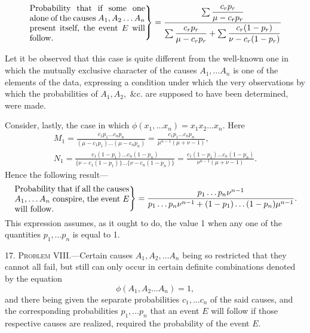 \documentclass[oneside]{book}
\begin{document}
\begin{equation*}
\left.\begin{minipage}{.4\linewidth}Probability that if some one
alone of the causes $A_1, A_2\dotsc A_n$
present itself, the event $E$
will follow.\end{minipage}\right\}
=\frac{\sum \displaystyle \frac{c_r p_r}{\mu - c_r p_r}}{\sum {\displaystyle \frac{c_r p_r}{\mu - c_r p_r}}+\sum \displaystyle \frac{c_r(1-p_r)}{\nu - c_r(1-p_r)}}
\end{equation*}

Let it be observed that this case is quite different from the
well-known one in which the mutually exclusive character of
the causes $A_1,\dotsc A_n$ is one of the elements of the data, expressing
a condition under which the very observations by which the
probabilities of $A_1, A_2,$ \&c. are supposed to have been determined,
were made.

Consider, lastly, the case in which $\phi(x_1,\dotsc x_n)=x_1 x_2 \dotsc x_n$.
Here
\begin{gather*}
M_1 = \frac{c_1 p_1 \dotsc c_n p_n}
           {(\mu - c_1 p_1)\dotsc (\mu-c_n p_n)}
=\frac{c_1 p_1 \dotsc c_n p_n}{\mu^{n-1}(\mu + \nu - 1)}, \\
N_1 = \frac{c_1(1-p_1)\dotsc c_n(1-p_n)}
           {\{\nu - c_1(1-p_1)\} \dotsc \{\nu-c_n(1-p_n)\}}
=\frac{c_1(1-p_1)\dotsc c_n(1-p_n)}{\nu^{n-1}(\mu + \nu -1)}.
\end{gather*}
Hence the following result---
\begin{equation*}
\left.\begin{minipage}{.4\linewidth}Probability that if all the
causes $A_1, \dotsc A_n$
conspire, the event $E$ will follow.
\end{minipage}\right\}
=\frac{p_1 \dotsc p_n \nu^{n-1}}
      {p_1 \dotsc p_n \nu^{n-1} + (1-p_1)\dotsc (1-p_n)\mu^{n-1}}.
\end{equation*}
This expression assumes, as it ought to do, the value 1 when any
one of the quantities $p_1, \dotsc p_n$ is equal to 1.

17. \textsc{Problem} VIII.---Certain causes $A_1, A_2,\dotsc A_n$ being so
restricted that they cannot all fail, but still can only occur in
certain definite combinations denoted by the equation
\begin{equation*}
\phi(A_1, A_2 \dotsc A_n)=1,
\end{equation*}
and there being given the separate probabilities $c_1,\dotsc c_n$ of the
said causes, and the corresponding probabilities $p_1, \dotsc p_n$ that an
event $E$ will follow if those respective causes are realized, required
the probability of the event $E$.
\end{document}
